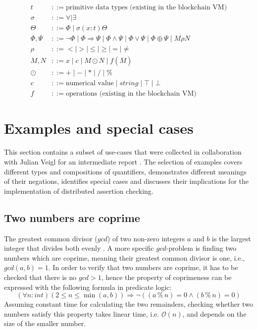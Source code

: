 \begin{align*}
    t &::= \text{primitive data types (existing in the blockchain VM)} \\
    \sigma &::= \forall \mid \exists \\
    \Theta &::= \Phi \mid \sigma (x:t) \Theta \\
    \Phi,\Psi &::= \neg\Phi \mid \Phi \Rightarrow \Psi \mid \Phi\wedge\Psi \mid
    				\Phi\vee\Psi \mid \Phi \oplus \Psi \mid M \rho N \\
    \rho &::= < \mid > \mid \le \mid \ge \mid = \mid \ne \\
    M, N &::= x \mid c \mid M \odot N  \mid f (\overline M) \\
    \odot &::= +\mid -\mid * \mid / \mid \% \\
    c &::= \text{numerical value} \mid string \mid \top \mid \bot \\
    f &::= \text{operations (existing in the blockchain VM)}
\end{align*}
\begingroup\vspace*{-\baselineskip}
\label{fig:formulas}
\vspace*{\baselineskip}\endgroup

\section{Examples and special cases}\label{sec:examples}
This section contains a subset of use-cases that were collected in collaboration with Julian Veigl for an intermediate report \cite{bernhardt_veigel_2020}. The selection of examples covers different types and compositions of quantifiers, demonstrates different meanings of their negations, identifies special cases and discusses their implications for the implementation of distributed assertion checking.

\subsection{Two numbers are coprime}\label{sec:coprime}
The greatest common divisor ($gcd$) of two non-zero integers $a$ and $b$ is the largest integer that divides both evenly \cite{hardy2008introduction}. A more specific $gcd$-problem is finding two numbers which are coprime, meaning their greatest common divisor is one, i.e., $gcd(a, b) = 1$. In order to verify that two numbers are coprime, it has to be checked that there is no $gcd > 1$, hence the property of coprimeness can be expressed with the following formula in predicate logic:
\begin{equation}\label{eq:coprime-universial}
    (\forall n : int) (2 \le n \le \min(a,b)) \Rightarrow \neg((a \mathbin{\%} n) = 0 \land (b \mathbin{\%} n) = 0)
\end{equation}
Assuming constant time for calculating the two remainders, checking whether two numbers satisfy this property takes linear time, i.e. $\mathcal{O}(n)$, and depends on the size of the smaller number.

